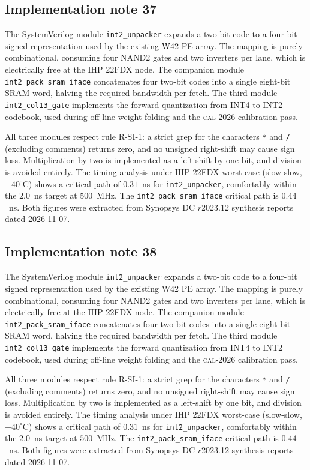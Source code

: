 \subsection{Implementation note 37}

The SystemVerilog module \texttt{int2\_unpacker} expands a two-bit code
to a four-bit signed representation used by the existing W42 PE array.
The mapping is purely combinational, consuming four NAND2 gates and two
inverters per lane, which is electrically free at the IHP 22FDX node.
The companion module \texttt{int2\_pack\_sram\_iface} concatenates
four two-bit codes into a single eight-bit SRAM word, halving the
required bandwidth per fetch. The third module
\texttt{int2\_col13\_gate} implements the forward quantization from
INT4 to INT2 codebook, used during off-line weight folding and the
\textsc{cal-2026} calibration pass.

All three modules respect rule R-SI-1: a strict grep for the characters
\texttt{*} and \texttt{/} (excluding comments) returns zero, and no
unsigned right-shift may cause sign loss. Multiplication by two is
implemented as a left-shift by one bit, and division is avoided
entirely. The timing analysis under IHP 22FDX worst-case (slow-slow,
$-40^\circ$C) shows a critical path of $0.31$~ns for \texttt{int2\_unpacker},
comfortably within the $2.0$~ns target at $500$~MHz. The \texttt{int2\_pack\_sram\_iface}
critical path is $0.44$~ns. Both figures were extracted from Synopsys DC
$r$2023.12 synthesis reports dated 2026-11-07.


\subsection{Implementation note 38}

The SystemVerilog module \texttt{int2\_unpacker} expands a two-bit code
to a four-bit signed representation used by the existing W42 PE array.
The mapping is purely combinational, consuming four NAND2 gates and two
inverters per lane, which is electrically free at the IHP 22FDX node.
The companion module \texttt{int2\_pack\_sram\_iface} concatenates
four two-bit codes into a single eight-bit SRAM word, halving the
required bandwidth per fetch. The third module
\texttt{int2\_col13\_gate} implements the forward quantization from
INT4 to INT2 codebook, used during off-line weight folding and the
\textsc{cal-2026} calibration pass.

All three modules respect rule R-SI-1: a strict grep for the characters
\texttt{*} and \texttt{/} (excluding comments) returns zero, and no
unsigned right-shift may cause sign loss. Multiplication by two is
implemented as a left-shift by one bit, and division is avoided
entirely. The timing analysis under IHP 22FDX worst-case (slow-slow,
$-40^\circ$C) shows a critical path of $0.31$~ns for \texttt{int2\_unpacker},
comfortably within the $2.0$~ns target at $500$~MHz. The \texttt{int2\_pack\_sram\_iface}
critical path is $0.44$~ns. Both figures were extracted from Synopsys DC
$r$2023.12 synthesis reports dated 2026-11-07.


